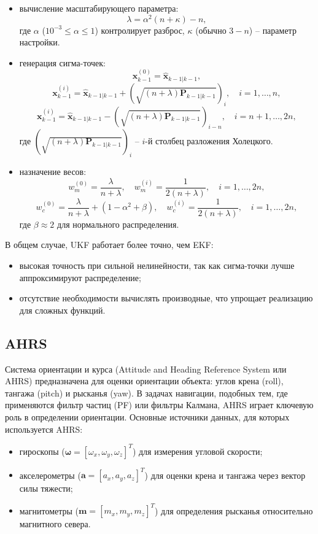 \begin{itemize}
    \item вычисление масштабирующего параметра:
    \[
    \lambda = \alpha^2 (n + \kappa) - n,
    \]
    где \(\alpha\) (\(10^{-3} \leq \alpha \leq 1\)) контролирует разброс, \(\kappa\) (обычно \(3 - n\)) -- параметр настройки.
    \item генерация сигма-точек:
    \[
    \mathbf{x}_{k-1}^{(0)} = \hat{\mathbf{x}}_{k-1|k-1},
    \]
    \[
    \mathbf{x}_{k-1}^{(i)} = \hat{\mathbf{x}}_{k-1|k-1} + (\sqrt{(n + \lambda) \mathbf{P}_{k-1|k-1}})_i, \quad i = 1, \dots, n,
    \]
    \[
    \mathbf{x}_{k-1}^{(i)} = \hat{\mathbf{x}}_{k-1|k-1} - (\sqrt{(n + \lambda) \mathbf{P}_{k-1|k-1}})_{i-n}, \quad i = n+1, \dots, 2n,
    \]
    где \((\sqrt{(n + \lambda) \mathbf{P}_{k-1|k-1}})_i\) -- \(i\)-й столбец разложения Холецкого.
    \item назначение весов:
    \[
    w_m^{(0)} = \frac{\lambda}{n + \lambda}, \quad w_m^{(i)} = \frac{1}{2(n + \lambda)}, \quad i = 1, \dots, 2n,
    \]
    \[
    w_c^{(0)} = \frac{\lambda}{n + \lambda} + (1 - \alpha^2 + \beta), \quad w_c^{(i)} = \frac{1}{2(n + \lambda)}, \quad i = 1, \dots, 2n,
    \]
    где \(\beta \approx 2\) для нормального распределения.
\end{itemize}

В общем случае, UKF работает более точно, чем EKF:
\begin{itemize}
    \item высокая точность при сильной нелинейности, так как сигма-точки лучше аппроксимируют распределение;
    \item отсутствие необходимости вычислять производные, что упрощает реализацию для сложных функций.
\end{itemize}

\subsection{AHRS}
\label{subsec:ahrs}

Система ориентации и курса (Attitude and Heading Reference System или AHRS) предназначена для оценки
ориентации объекта: углов крена (roll), тангажа (pitch) и рысканья (yaw).
В задачах навигации, подобных тем, где применяются фильтр частиц (PF) или фильтры Калмана,
AHRS играет ключевую роль в определении ориентации.
Основные источники данных, для которых используется AHRS: 
\begin{itemize}
    \item гироскопы (\(\boldsymbol{\omega} = [\omega_x, \omega_y, \omega_z]^T\)) для измерения угловой скорости;
    \item акселерометры (\(\mathbf{a} = [a_x, a_y, a_z]^T\)) для оценки крена и тангажа через вектор силы тяжести;
    \item магнитометры (\(\mathbf{m} = [m_x, m_y, m_z]^T\)) для определения рысканья относительно магнитного севера.
\end{itemize}

